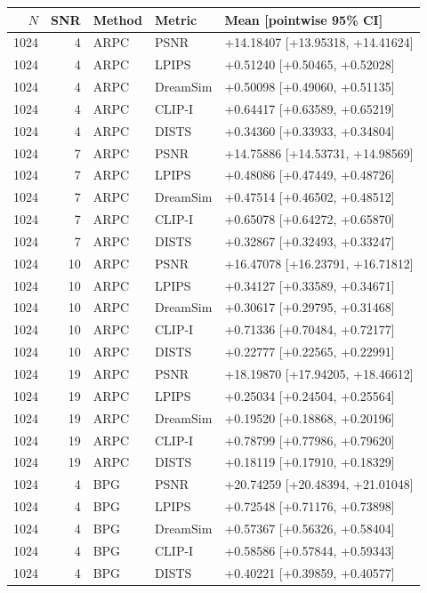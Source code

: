 \documentclass[10pt,letterpaper]{article}
\begin{document}
\begin{longtable}{@{}rrlll@{}}\toprule
$N$ & SNR & Method & Metric & Mean [pointwise 95\% CI]\\\midrule\endhead
1024 & 4 & ARPC & PSNR & +14.18407 [+13.95318, +14.41624]\\
1024 & 4 & ARPC & LPIPS & +0.51240 [+0.50465, +0.52028]\\
1024 & 4 & ARPC & DreamSim & +0.50098 [+0.49060, +0.51135]\\
1024 & 4 & ARPC & CLIP-I & +0.64417 [+0.63589, +0.65219]\\
1024 & 4 & ARPC & DISTS & +0.34360 [+0.33933, +0.34804]\\
1024 & 7 & ARPC & PSNR & +14.75886 [+14.53731, +14.98569]\\
1024 & 7 & ARPC & LPIPS & +0.48086 [+0.47449, +0.48726]\\
1024 & 7 & ARPC & DreamSim & +0.47514 [+0.46502, +0.48512]\\
1024 & 7 & ARPC & CLIP-I & +0.65078 [+0.64272, +0.65870]\\
1024 & 7 & ARPC & DISTS & +0.32867 [+0.32493, +0.33247]\\
1024 & 10 & ARPC & PSNR & +16.47078 [+16.23791, +16.71812]\\
1024 & 10 & ARPC & LPIPS & +0.34127 [+0.33589, +0.34671]\\
1024 & 10 & ARPC & DreamSim & +0.30617 [+0.29795, +0.31468]\\
1024 & 10 & ARPC & CLIP-I & +0.71336 [+0.70484, +0.72177]\\
1024 & 10 & ARPC & DISTS & +0.22777 [+0.22565, +0.22991]\\
1024 & 19 & ARPC & PSNR & +18.19870 [+17.94205, +18.46612]\\
1024 & 19 & ARPC & LPIPS & +0.25034 [+0.24504, +0.25564]\\
1024 & 19 & ARPC & DreamSim & +0.19520 [+0.18868, +0.20196]\\
1024 & 19 & ARPC & CLIP-I & +0.78799 [+0.77986, +0.79620]\\
1024 & 19 & ARPC & DISTS & +0.18119 [+0.17910, +0.18329]\\
1024 & 4 & BPG & PSNR & +20.74259 [+20.48394, +21.01048]\\
1024 & 4 & BPG & LPIPS & +0.72548 [+0.71176, +0.73898]\\
1024 & 4 & BPG & DreamSim & +0.57367 [+0.56326, +0.58404]\\
1024 & 4 & BPG & CLIP-I & +0.58586 [+0.57844, +0.59343]\\
1024 & 4 & BPG & DISTS & +0.40221 [+0.39859, +0.40577]\\

\end{longtable}
\end{document}
